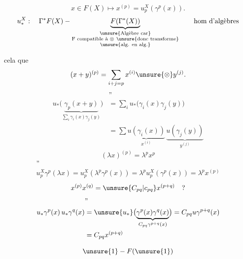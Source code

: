 
\[
x\in F(X)\longmapsto x^{(p)}=u_p^X(\gamma^p(x)).
\]
\[
u_*^X:\quad \Gamma^*F(X)-
\underbrace{F(\Gamma^*(X))}_{\substack{\unsure{\text{Algèbre car}}\\
\text{F compatible à }\otimes\ \unsure{\text{donc transforme}}\\
\unsure{\text{alg. en alg.}}}}
\qquad \text{hom d'algèbres}
\]

cela   que
\[
(x+y)^{(p)}=\sum_{i+j=p}x^{(i)}\unsure{\otimes}y^{(j)}.
\]
\[
\begin{aligned}
&\text{''}\\
u_*\bigl(\underbrace{\gamma_p(x+y)}_{\sum_i\gamma_i(x)\gamma_j(y)}\bigr)
&=\sum_i u_*\bigl(\gamma_i(x)\gamma_j(y)\bigr)\\
&=\sum\underbrace{u(\gamma_i(x))}_{x^{(i)}}\,
\underbrace{u(\gamma_j(y))}_{y^{(j)}}
\end{aligned}
\]
\[
(\lambda x)^{(p)}=\lambda^p x^p
\]
\[
\begin{gathered}
\text{''}\\
u_p^X\gamma^p(\lambda x)=u_p^X(\lambda^p\gamma^p(x))
=\lambda^p u_p^X(\gamma^p(x))=\lambda^p x^{(p)}
\end{gathered}
\]
\[
x^{(p)}x^{(q)}=\unsure{C_{pq}|c_{pq}}x^{(p+q)}\quad ?
\]
\[
\begin{aligned}
&\text{''}\\
u_*\gamma^p(x)\,u_*\gamma^q(x)
&=\unsure{u_*}\bigl(\underbrace{\gamma^p(x)\gamma^q(x)}_{C_{pq}\gamma^{p+q}(x)}\bigr)
=C_{pq}u\gamma^{p+q}(x)\\
&=C_{pq}x^{(p+q)}
\end{aligned}
\]

\[
\unsure{1}-F(\unsure{1})
\]

